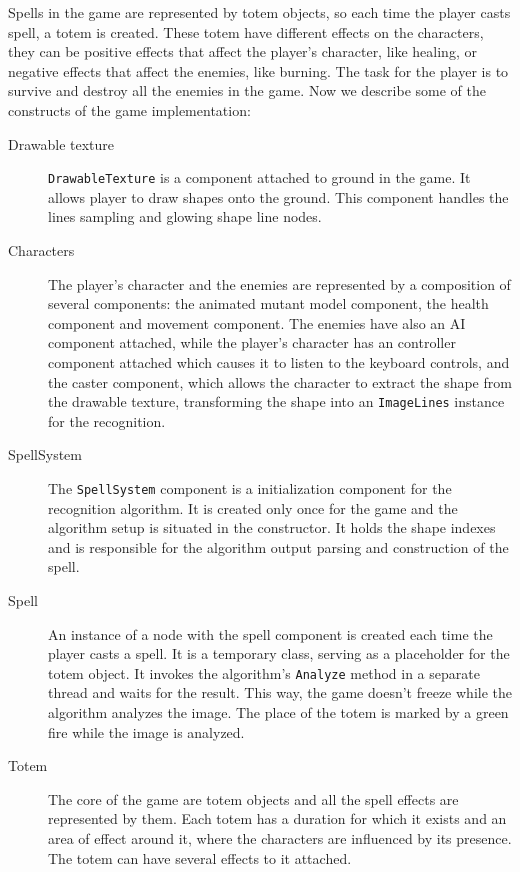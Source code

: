 Spells in the game are represented by totem objects, so each time the player casts spell, a totem is created. These totem have different effects on the characters, they can be positive effects that affect the player's character, like healing, or negative effects that affect the enemies, like burning. The task for the player is to survive and destroy all the enemies in the game. 
Now we describe some of the constructs of the game implementation:

\begin{description}
\item [Drawable texture] \texttt{DrawableTexture} is a component attached to ground in the game. It allows player to draw shapes onto the ground. This component handles the lines sampling and glowing shape line nodes.

\item [Characters] The player's character and the enemies are represented by a composition of several components: the animated mutant model component, the health component and movement component. The enemies have also an AI component attached, while the player's character has an controller component attached which causes it to listen to the keyboard controls, and the caster component, which allows the character to extract the shape from the drawable texture, transforming the shape into an \texttt{ImageLines} instance for the recognition.

\item [SpellSystem] The \texttt{SpellSystem} component is a initialization component for the recognition algorithm. It is created only once for the game and the algorithm setup is situated in the constructor. It holds the shape indexes and is responsible for the algorithm output parsing and construction of the spell.

\item [Spell] An instance of a node with the spell component is created each time the player casts a spell. It is a temporary class, serving as a placeholder for the totem object. It invokes the algorithm's \texttt{Analyze} method in a separate thread and waits for the result. This way, the game doesn't freeze while the algorithm analyzes the image. The place of the totem is marked by a green fire while the image is analyzed. 

\item [Totem] The core of the game are totem objects and all the spell effects are represented by them. Each totem has a duration for which it exists and an area of effect around it, where the characters are influenced by its presence. The totem can have several effects to it attached.


\end{description}
